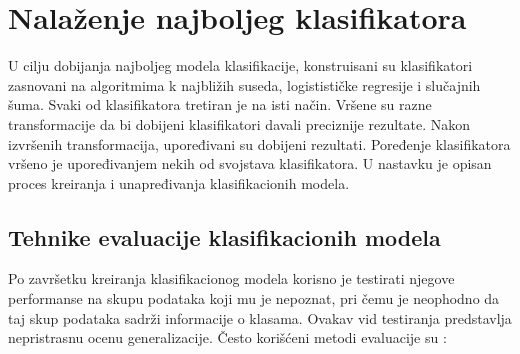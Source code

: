 \documentclass[12pt,oneside]{memoir}
\begin{document}
\section{Nalaženje najboljeg klasifikatora}

U cilju dobijanja najboljeg modela klasifikacije, konstruisani su klasifikatori zasnovani na algoritmima k najbližih suseda, logistističke regresije i slučajnih šuma. Svaki od klasifikatora tretiran je na isti način. Vršene su razne transformacije da bi dobijeni klasifikatori davali preciznije rezultate. Nakon izvršenih transformacija, upoređivani su dobijeni rezultati. Poređenje klasifikatora vršeno je upoređivanjem nekih od svojstava klasifikatora. U nastavku je opisan proces kreiranja i unapređivanja klasifikacionih modela.  

\subsection{Tehnike evaluacije klasifikacionih modela} \label{evaluacija}

Po završetku kreiranja klasifikacionog modela korisno je testirati njegove performanse na skupu podataka koji mu je nepoznat, pri čemu je neophodno da taj skup podataka sadrži informacije o klasama. Ovakav vid testiranja predstavlja nepristrasnu ocenu generalizacije. Često korišćeni metodi evaluacije su  \cite{mitic, mladen, aggarwal, UMLFTA}: 
\end{document}
